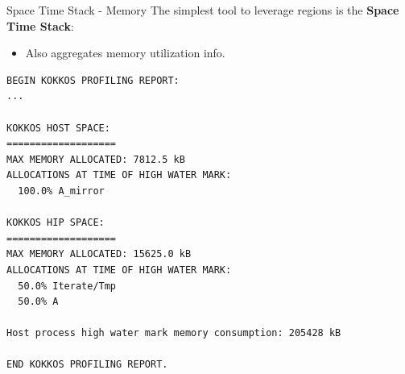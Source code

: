 
\begin{frame}[fragile]{Space Time Stack - Memory}
The simplest tool to leverage regions is the \textbf{Space Time Stack}:

\begin{itemize}
  \item Also aggregates memory utilization info.
\end{itemize}

\begin{verbatim}
BEGIN KOKKOS PROFILING REPORT:
...

KOKKOS HOST SPACE:
===================
MAX MEMORY ALLOCATED: 7812.5 kB
ALLOCATIONS AT TIME OF HIGH WATER MARK:
  100.0% A_mirror

KOKKOS HIP SPACE:
===================
MAX MEMORY ALLOCATED: 15625.0 kB
ALLOCATIONS AT TIME OF HIGH WATER MARK:
  50.0% Iterate/Tmp
  50.0% A

Host process high water mark memory consumption: 205428 kB

END KOKKOS PROFILING REPORT.
\end{verbatim}

\end{frame}


